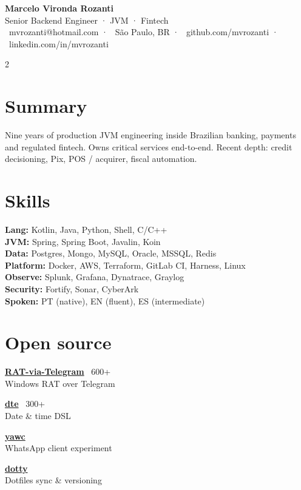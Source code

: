 \documentclass[10pt,a4paper]{article}
\begin{document}
\pagestyle{empty}

\begin{center}
{\Huge\bfseries Marcelo Vironda Rozanti}\\[2pt]
{\color{accent}\large Senior Backend Engineer · JVM · Fintech}\\[3pt]
{\footnotesize \faEnvelope\ mvrozanti@hotmail.com · \faMapMarker*\ São Paulo, BR · \faGithub\ github.com/mvrozanti · \faLinkedin\ linkedin.com/in/mvrozanti}
\end{center}
\vspace{2pt}

\begin{paracol}{2}

\section{Summary}
\small Nine years of production JVM engineering inside Brazilian banking, payments and regulated fintech. Owns critical services end-to-end. Recent depth: credit decisioning, Pix, POS / acquirer, fiscal automation.

\section{Skills}
\footnotesize
\textbf{Lang:} Kotlin, Java, Python, Shell, C/C++ \\
\textbf{JVM:} Spring, Spring Boot, Javalin, Koin \\
\textbf{Data:} Postgres, Mongo, MySQL, Oracle, MSSQL, Redis \\
\textbf{Platform:} Docker, AWS, Terraform, GitLab CI, Harness, Linux \\
\textbf{Observe:} Splunk, Grafana, Dynatrace, Graylog \\
\textbf{Security:} Fortify, Sonar, CyberArk \\
\textbf{Spoken:} PT (native), EN (fluent), ES (intermediate)

\section{Open source}
\footnotesize
\textbf{\href{https://github.com/mvrozanti/RAT-via-Telegram}{RAT-via-Telegram}} \hfill \faStar\ 600+\\Windows RAT over Telegram\par\smallskip
\textbf{\href{https://github.com/mvrozanti/dte}{dte}} \hfill \faStar\ 300+\\Date \& time DSL\par\smallskip
\textbf{\href{https://github.com/mvrozanti/yawc}{yawc}}\\WhatsApp client experiment\par\smallskip
\textbf{\href{https://github.com/mvrozanti/dotty}{dotty}}\\Dotfiles sync \& versioning


\end{paracol}
\end{document}
